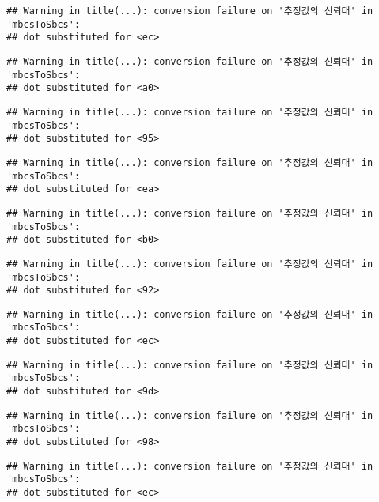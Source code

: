 \documentclass[
]{article}
\begin{document}
\begin{verbatim}
## Warning in title(...): conversion failure on '추정값의 신뢰대' in 'mbcsToSbcs':
## dot substituted for <ec>
\end{verbatim}

\begin{verbatim}
## Warning in title(...): conversion failure on '추정값의 신뢰대' in 'mbcsToSbcs':
## dot substituted for <a0>
\end{verbatim}

\begin{verbatim}
## Warning in title(...): conversion failure on '추정값의 신뢰대' in 'mbcsToSbcs':
## dot substituted for <95>
\end{verbatim}

\begin{verbatim}
## Warning in title(...): conversion failure on '추정값의 신뢰대' in 'mbcsToSbcs':
## dot substituted for <ea>
\end{verbatim}

\begin{verbatim}
## Warning in title(...): conversion failure on '추정값의 신뢰대' in 'mbcsToSbcs':
## dot substituted for <b0>
\end{verbatim}

\begin{verbatim}
## Warning in title(...): conversion failure on '추정값의 신뢰대' in 'mbcsToSbcs':
## dot substituted for <92>
\end{verbatim}

\begin{verbatim}
## Warning in title(...): conversion failure on '추정값의 신뢰대' in 'mbcsToSbcs':
## dot substituted for <ec>
\end{verbatim}

\begin{verbatim}
## Warning in title(...): conversion failure on '추정값의 신뢰대' in 'mbcsToSbcs':
## dot substituted for <9d>
\end{verbatim}

\begin{verbatim}
## Warning in title(...): conversion failure on '추정값의 신뢰대' in 'mbcsToSbcs':
## dot substituted for <98>
\end{verbatim}

\begin{verbatim}
## Warning in title(...): conversion failure on '추정값의 신뢰대' in 'mbcsToSbcs':
## dot substituted for <ec>
\end{verbatim}
\end{document}
